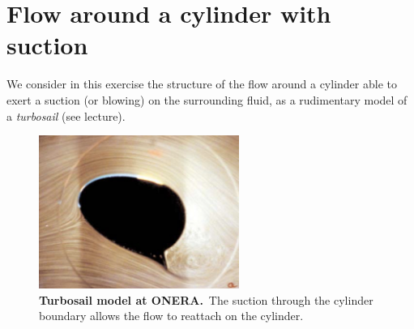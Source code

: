 \documentclass[11pt,a4paper]{article}
\begin{document}
\section{Flow around a cylinder with suction}
We consider in this exercise the structure of the flow around a cylinder able to exert a suction (or blowing) on the surrounding fluid, as a rudimentary model of a \textit{turbosail} (see lecture).
\begin{figure}[ht]
    \centering
    \includegraphics[height=5cm,valign=m]{aspiration_cylindre.jpg}
    \caption{\textbf{Turbosail model at ONERA.} The suction through the cylinder boundary allows the flow to reattach on the cylinder.}
    \label{fig:turbosail}
\end{figure}
\end{document}
